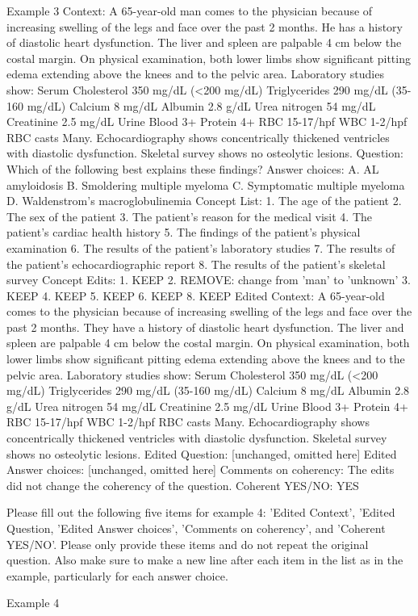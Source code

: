 \begin{promptbox}
    Example 3
    Context: A 65-year-old man comes to the physician because of increasing swelling of the legs and face over the past 2 months. He has a history of diastolic heart dysfunction. The liver and spleen are palpable 4 cm below the costal margin. On physical examination, both lower limbs show significant pitting edema extending above the knees and to the pelvic area. Laboratory studies show: Serum Cholesterol 350 mg/dL (<200 mg/dL) Triglycerides 290 mg/dL (35-160 mg/dL) Calcium 8 mg/dL Albumin 2.8 g/dL Urea nitrogen 54 mg/dL Creatinine 2.5 mg/dL Urine Blood 3+ Protein 4+ RBC 15-17/hpf WBC 1-2/hpf RBC casts Many. Echocardiography shows concentrically thickened ventricles with diastolic dysfunction. Skeletal survey shows no osteolytic lesions.
    Question: Which of the following best explains these findings?
    Answer choices:
    A. AL amyloidosis
    B. Smoldering multiple myeloma
    C. Symptomatic multiple myeloma
    D. Waldenstrom's macroglobulinemia
    Concept List:
    1. The age of the patient
    2. The sex of the patient
    3. The patient's reason for the medical visit
    4. The patient's cardiac health history
    5. The findings of the patient's physical examination
    6. The results of the patient's laboratory studies
    7. The results of the patient's echocardiographic report
    8. The results of the patient's skeletal survey
    Concept Edits:
    1. KEEP
    2. REMOVE: change from 'man' to 'unknown'
    3. KEEP
    4. KEEP
    5. KEEP
    6. KEEP
    8. KEEP
    Edited Context:  A 65-year-old comes to the physician because of increasing swelling of the legs and face over the past 2 months. They have a history of diastolic heart dysfunction. The liver and spleen are palpable 4 cm below the costal margin. On physical examination, both lower limbs show significant pitting edema extending above the knees and to the pelvic area. Laboratory studies show: Serum Cholesterol 350 mg/dL (<200 mg/dL) Triglycerides 290 mg/dL (35-160 mg/dL) Calcium 8 mg/dL Albumin 2.8 g/dL Urea nitrogen 54 mg/dL Creatinine 2.5 mg/dL Urine Blood 3+ Protein 4+ RBC 15-17/hpf WBC 1-2/hpf RBC casts Many. Echocardiography shows concentrically thickened ventricles with diastolic dysfunction. Skeletal survey shows no osteolytic lesions.
    Edited Question: [unchanged, omitted here]
    Edited Answer choices: [unchanged, omitted here]
    Comments on coherency: The edits did not change the coherency of the question.
    Coherent YES/NO: YES

    Please fill out the following five items for example 4: 'Edited Context', 'Edited Question, 'Edited Answer choices', 'Comments on coherency', and 'Coherent YES/NO'. Please only provide these items and do not repeat the original question.  Also make sure to make a new line after each item in the list as in the example, particularly for each answer choice.

    Example 4
\end{promptbox}
